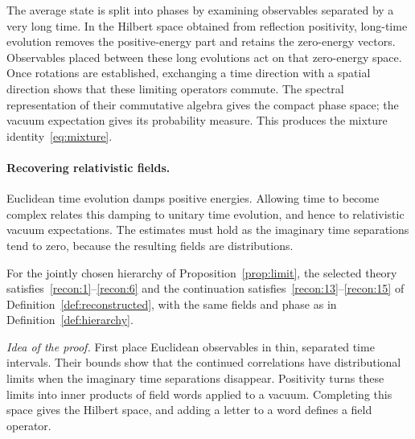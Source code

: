 The average state is split into phases by examining observables separated by a very long time.
In the Hilbert space obtained from reflection positivity, long-time evolution removes the positive-energy part and retains the zero-energy vectors.
Observables placed between these long evolutions act on that zero-energy space.
Once rotations are established, exchanging a time direction with a spatial direction shows that these limiting operators commute.
The spectral representation of their commutative algebra gives the compact phase space; the vacuum expectation gives its probability measure.
This produces the mixture identity~\eqref{eq:mixture}.


\paragraph{Recovering relativistic fields.}
Euclidean time evolution damps positive energies.
Allowing time to become complex relates this damping to unitary time evolution, and hence to relativistic vacuum expectations.
The estimates must hold as the imaginary time separations tend to zero, because the resulting fields are distributions.

\begin{proposition}\label{prop:reconstruction}
For the jointly chosen hierarchy of Proposition~\ref{prop:limit}, the selected theory satisfies~\ref{recon:1}--\ref{recon:6} and the continuation satisfies~\ref{recon:13}--\ref{recon:15} of Definition~\ref{def:reconstructed}, with the same fields and phase as in Definition~\ref{def:hierarchy}.
\end{proposition}

\emph{Idea of the proof.}
First place Euclidean observables in thin, separated time intervals.
Their bounds show that the continued correlations have distributional limits when the imaginary time separations disappear.
Positivity turns these limits into inner products of field words applied to a vacuum.
Completing this space gives the Hilbert space, and adding a letter to a word defines a field operator.

